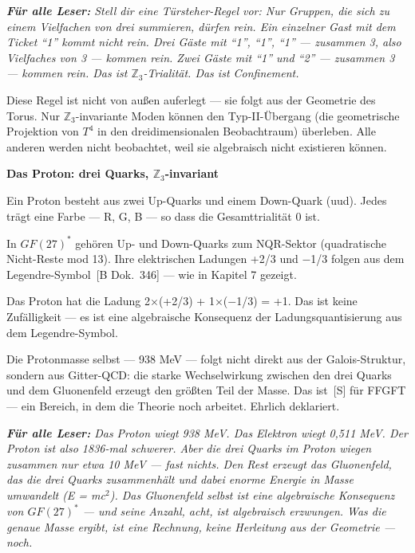 \documentclass[11pt,oneside]{book}
\newcommand{\status}[1]{\penalty10000\,{\scriptsize\textcolor{gray!60}{[#1]}}}
\newenvironment{laierspur}{%
  \par\vspace{4pt}%
  \noindent\small\itshape\color{blue!60!black}%
  \textbf{Für alle Leser:}\enspace\ignorespaces}{%
  \par\vspace{4pt}\normalsize\normalfont\normalcolor}
\begin{document}
\begin{laierspur}
Stell dir eine Türsteher-Regel vor: Nur Gruppen, die sich
zu einem Vielfachen von drei summieren, dürfen rein. Ein einzelner
Gast mit dem Ticket \enquote{1} kommt nicht rein. Drei Gäste mit \enquote{1}, \enquote{1},
\enquote{1} — zusammen 3, also Vielfaches von 3 — kommen rein. Zwei Gäste
mit \enquote{1} und \enquote{2} — zusammen 3 — kommen rein. Das ist $\mathbb{Z}_3$-Trialität.
Das ist Confinement.
\end{laierspur}

Diese Regel ist nicht von außen auferlegt — sie folgt aus der Geometrie
des Torus. Nur $\mathbb{Z}_3$-invariante Moden können den Typ-II-Übergang (die
geometrische Projektion von $T^4$ in den dreidimensionalen Beobachtraum)
überleben. Alle anderen werden nicht beobachtet, weil sie algebraisch
nicht existieren können.


\textbf{Das Proton: drei Quarks, $\mathbb{Z}_3$-invariant}


Ein Proton besteht aus zwei Up-Quarks und einem Down-Quark (uud). Jedes
trägt eine Farbe — {R, G, B} — so dass die Gesamttrialität 0 ist.


In $GF(27)^*$ gehören Up- und Down-Quarks zum NQR-Sektor (quadratische
Nicht-Reste mod 13). Ihre elektrischen Ladungen +2/3 und $-$1/3 folgen
aus dem Legendre-Symbol \status{B Dok.~346} — wie in Kapitel 7 gezeigt.


Das Proton hat die Ladung 2$\times$(+2/3) + 1$\times$($-$1/3) = +1. Das ist keine
Zufälligkeit — es ist eine algebraische Konsequenz der Ladungsquantisierung
aus dem Legendre-Symbol.


Die Protonmasse selbst — 938 MeV — folgt nicht direkt aus der
Galois-Struktur, sondern aus Gitter-QCD: die starke Wechselwirkung
zwischen den drei Quarks und dem Gluonenfeld erzeugt den größten Teil
der Masse. Das ist \status{S} für FFGFT — ein Bereich, in dem die Theorie noch
arbeitet. Ehrlich deklariert.


\begin{laierspur}
Das Proton wiegt 938 MeV. Das Elektron wiegt 0,511 MeV.
Der Proton ist also 1836-mal schwerer. Aber die drei Quarks im Proton
wiegen zusammen nur etwa 10 MeV — fast nichts. Den Rest erzeugt das
Gluonenfeld, das die drei Quarks zusammenhält und dabei enorme Energie
in Masse umwandelt (E = mc$^2$). Das Gluonenfeld selbst ist eine algebraische
Konsequenz von $GF(27)^*$ — und seine Anzahl, acht, ist algebraisch
erzwungen. Was die genaue Masse ergibt, ist eine Rechnung, keine
Herleitung aus der Geometrie — noch.
\end{laierspur}
\end{document}
